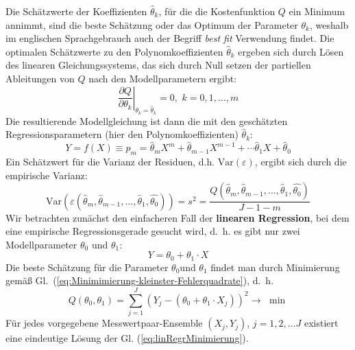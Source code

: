 Die Schätzwerte der Koeffizienten $\hat{\theta}_k$, für die die Kostenfunktion $Q$ ein Minimum annimmt, sind
die beste Schätzung oder das Optimum der Parameter $\theta _k $, weshalb im englischen Sprachgebrauch auch der Begriff
\textsl{best fit} Verwendung findet. Die optimalen Schätzwerte zu den
Polynomkoeffizienten $\hat{\theta}_k$ ergeben sich durch Lösen des linearen Gleichungssystems,
das sich durch Null setzen der partiellen Ableitungen von $Q$ nach den Modellparametern ergibt:
\begin{equation}
\left. {\frac{\partial Q}{\partial \theta _k }} \right|_{\theta_k
	=  \hat\theta_k } = 0,\,\,k = 0,1,\ldots ,m
\label{linRegGleichungssystem}
\end{equation}
Die resultierende Modellgleichung ist dann die mit den geschätzten
Regressionsparametern (hier den Polynomkoeffizienten) $\hat\theta_k$:
\begin{equation}
Y = f(X) \equiv p_m = \hat\theta_m X ^m + \hat\theta_{m - 1} X
^{m - 1} + \cdots \hat\theta_1 X + \hat\theta_0
\end{equation}
Ein Schätzwert für die Varianz der Residuen, d.h.
$\mathrm{Var}(\varepsilon)$, ergibt sich durch die empirische Varianz:
\begin{equation}
\mathrm{Var}(\varepsilon(\hat{\theta}_m ,\hat{\theta}_{m - 1} ,\ldots ,\hat{\theta}_1 
,\hat{\theta_0} )) = s^2 = \frac{Q(\hat{\theta}_m ,\hat{\theta}_{m - 1}
	,\ldots ,\hat{\theta}_1 ,\hat{\theta_0} )}{J - 1 - m}
\label{eq:s_quadrat_Regresssion}
\end{equation}
Wir betrachten zunächst den einfacheren Fall der \textbf{linearen Regression},
bei dem eine empirische Regressionsgerade  gesucht wird, d.~h. 
es gibt nur zwei Modellparameter $\theta_0$ und $\theta_1$:
\begin{equation}
Y = \theta_0 + \theta_1 \cdot X
\end{equation}
Die beste Schätzung für die Parameter $\theta _0 $und
$\theta _1 $ findet man durch Minimierung gemäß
Gl.~(\ref{eq:Minimimierung-kleinster-Fehlerquadrate}),
d.~h.
\begin{equation}
\label{eq:linRegrMinimierung}
Q(\theta _0 ,\theta _1 ) = \sum\limits_{j = 1}^J {(Y_j
	- (\theta _0 + \theta _1 \cdot X_j))^2 \to } \,\,\min
\end{equation}
Für jedes vorgegebene Messwertpaar-Ensemble $(X_j ,Y_j )$, $j
= 1,2,\ldots J$ existiert eine eindeutige Lösung der Gl.
(\ref{eq:linRegrMinimierung}).

